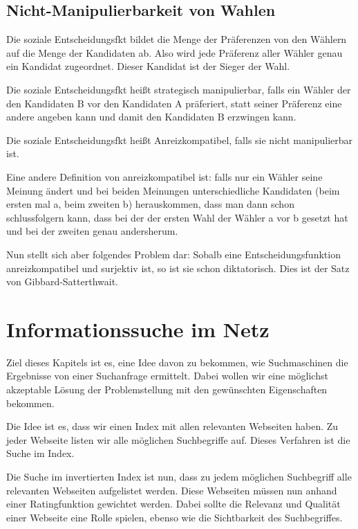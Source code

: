 \documentclass[]{article}
\begin{document}
\subsection{Nicht-Manipulierbarkeit von Wahlen}

 Die soziale Entscheidungsfkt bildet die Menge der Präferenzen von den Wählern auf die Menge der Kandidaten ab. Also wird jede Präferenz aller Wähler genau ein Kandidat zugeordnet. Dieser Kandidat ist der Sieger der Wahl.
 
 Die soziale Entscheidungsfkt heißt strategisch manipulierbar, falls ein Wähler der den Kandidaten B vor den Kandidaten A präferiert, statt seiner Präferenz eine andere angeben kann und damit den Kandidaten B erzwingen kann. 
 
 Die soziale Entscheidungsfkt heißt Anreizkompatibel, falls sie nicht manipulierbar ist. 
 
Eine andere Definition von anreizkompatibel ist: falls nur ein Wähler seine Meinung ändert und bei beiden Meinungen unterschiedliche Kandidaten (beim ersten mal a, beim zweiten b) herauskommen, dass man dann schon schlussfolgern kann, dass bei der der ersten Wahl der Wähler a vor b gesetzt hat und bei der zweiten genau andersherum. 

Nun stellt sich aber folgendes Problem dar: Sobalb eine Entscheidungsfunktion anreizkompatibel und surjektiv ist, so ist sie schon diktatorisch. Dies ist der Satz von Gibbard-Satterthwait. 
 
\section{Informationssuche im Netz}
Ziel dieses Kapitels ist es, eine Idee davon zu bekommen, wie Suchmaschinen die Ergebnisse von einer Suchanfrage ermittelt. Dabei wollen wir eine möglichst akzeptable Lösung der Problemstellung mit den gewünschten Eigenschaften bekommen. 

Die Idee ist es, dass wir einen Index mit allen relevanten Webseiten haben. Zu jeder Webseite listen wir alle möglichen Suchbegriffe auf. Dieses Verfahren ist die Suche im Index.

Die Suche im invertierten Index ist nun, dass zu jedem möglichen Suchbegriff alle relevanten Webseiten aufgelistet werden. Diese Webseiten müssen nun anhand einer Ratingfunktion gewichtet werden. Dabei sollte die Relevanz und Qualität einer Webseite eine Rolle spielen, ebenso wie die Sichtbarkeit des Suchbegriffes. \\ 
\end{document}
